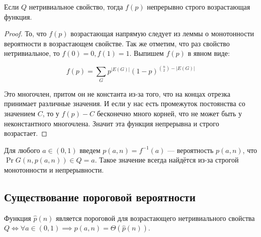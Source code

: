 \begin{lemma}
  Если $Q$ нетривиальное свойство, тогда $f(p)$ непрерывно строго возрастающая функция.
\end{lemma}

\begin{proof}
  То, что $f(p)$ возрастающая напрямую следует из леммы о монотонности вероятности
  в возрастающем свойстве. Так же отметим, что раз свойство нетривиальное, то
  $f(0) = 0, f(1) = 1$. Выпишем $f(p)$ в явном виде:

  \[
    f(p) = \sum\limits_{G} p^{|E(G)|}(1 - p)^{\binom{n}{2}-|E(G)|}
  \]

  Это многочлен, притом он не константа из-за того, что на концах отрезка принимает
  различные значения. И если у нас есть промежуток постоянства со значением 
  $C$, то у $f(p) - C$ бесконечно много корней, что не может быть у неконстантного
  многочлена. Значит эта функция непрерывна и строго возрастает.
\end{proof}

\begin{definition}
  Для любого $a \in (0, 1)$ введем $p(a, n) = f^{-1}(a)$ --- вероятность $p(a, n)$,
  что $\Pr{G(n, p(a, n)) \in Q} = a$. Такое значение всегда найдётся из-за 
  строгой монотонности и непрерывности.
\end{definition}

\subsection{Существование пороговой вероятности}

\begin{theorem}
  Функция $\hat{p}(n)$ является пороговой для возрастающего нетривиального свойства
  $Q \iff \forall a \in (0, 1) \implies p(a, n) = \Theta(\hat{p}(n))$. 
\end{theorem}

